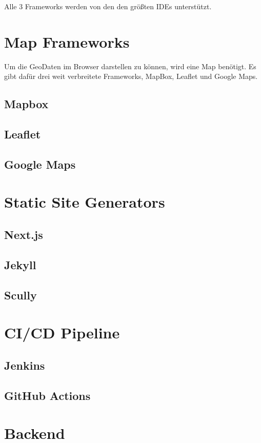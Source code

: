 Alle 3 Frameworks werden von den den größten IDEs unterstützt.

\section{Map Frameworks}
Um die GeoDaten im Browser darstellen zu können, wird eine Map benötigt. Es gibt dafür drei weit verbreitete Frameworks, MapBox, Leaflet und Google Maps.

\subsection{Mapbox}
\subsection{Leaflet}
\subsection{Google Maps}

\section{Static Site Generators}
\subsection{Next.js}
\subsection{Jekyll}
\subsection{Scully}

\section{CI/CD Pipeline}
\subsection{Jenkins}
\subsection{GitHub Actions}

\section{Backend}
